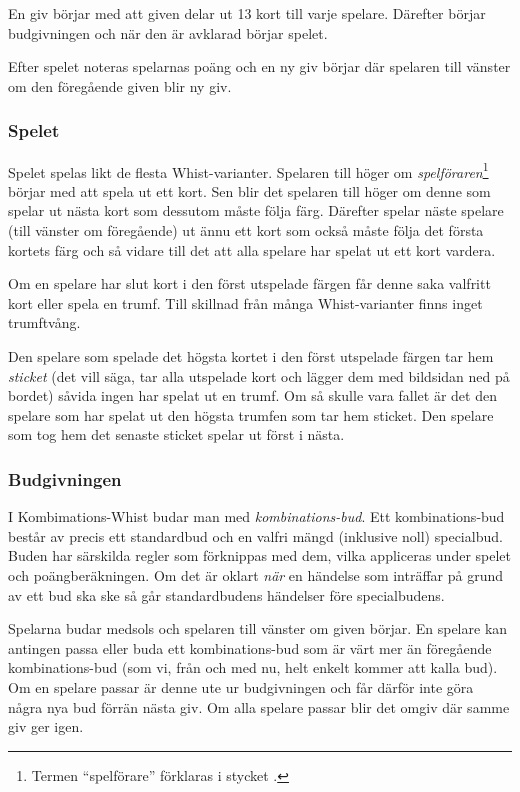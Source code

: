 \documentclass[a4paper]{article}
\begin{document}
			En giv börjar med att given delar ut 13 kort till varje spelare. Därefter börjar budgivningen och när den är avklarad börjar spelet.

			Efter spelet noteras spelarnas poäng och en ny giv börjar där spelaren till vänster om den föregående given blir ny giv.

			\subsubsection{Spelet}
				Spelet spelas likt de flesta Whist-varianter. Spelaren till höger om \emph{spelföraren}\footnote{Termen ``spelförare'' förklaras i stycket \textit{}.} börjar med att spela ut ett kort. Sen blir det spelaren till höger om denne som spelar ut nästa kort som dessutom måste följa färg. Därefter spelar näste spelare (till vänster om föregående) ut ännu ett kort som också måste följa det första kortets färg och så vidare till det att alla spelare har spelat ut ett kort vardera.

				Om en spelare har slut kort i den först utspelade färgen får denne saka valfritt kort eller spela en trumf. Till skillnad från många Whist-varianter finns inget trumftvång.

				Den spelare som spelade det högsta kortet i den först utspelade färgen tar hem \emph{sticket} (det vill säga, tar alla utspelade kort och lägger dem med bildsidan ned på bordet) såvida ingen har spelat ut en trumf. Om så skulle vara fallet är det den spelare som har spelat ut den högsta trumfen som tar hem sticket. Den spelare som tog hem det senaste sticket spelar ut först i nästa.

			\subsubsection{Budgivningen}
				\label{sec:bidding}
				I Kombimations-Whist budar man med \emph{kombinations-bud}. Ett kombinations-bud består av precis ett standardbud och en valfri mängd (inklusive noll) specialbud. Buden har särskilda regler som förknippas med dem, vilka appliceras under spelet och poängberäkningen. Om det är oklart \emph{när} en händelse som inträffar på grund av ett bud ska ske så går standardbudens händelser före specialbudens.

				Spelarna budar medsols och spelaren till vänster om given börjar. En spelare kan antingen passa eller buda ett kombinations-bud som är värt mer än föregående kombinations-bud (som vi, från och med nu, helt enkelt kommer att kalla bud). Om en spelare passar är denne ute ur budgivningen och får därför inte göra några nya bud förrän nästa giv. Om alla spelare passar blir det omgiv där samme giv ger igen.
\end{document}
